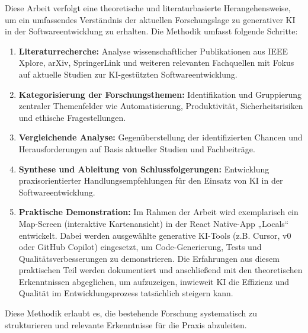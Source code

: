 Diese Arbeit verfolgt eine theoretische und literaturbasierte Herangehensweise, um ein umfassendes Verständnis der aktuellen Forschungslage zu generativer KI in der Softwareentwicklung zu erhalten. Die Methodik umfasst folgende Schritte:
\begin{enumerate}
    \item \textbf{Literaturrecherche:} Analyse wissenschaftlicher Publikationen aus IEEE Xplore, arXiv, SpringerLink und weiteren relevanten Fachquellen mit Fokus auf aktuelle Studien zur KI-gestützten Softwareentwicklung.
    \item \textbf{Kategorisierung der Forschungsthemen:} Identifikation und Gruppierung zentraler Themenfelder wie Automatisierung, Produktivität, Sicherheitsrisiken und ethische Fragestellungen.
    \item \textbf{Vergleichende Analyse:} Gegenüberstellung der identifizierten Chancen und Herausforderungen auf Basis aktueller Studien und Fachbeiträge.
    \item \textbf{Synthese und Ableitung von Schlussfolgerungen:} Entwicklung praxisorientierter Handlungsempfehlungen für den Einsatz von KI in der Softwareentwicklung.
    \item \textbf{Praktische Demonstration:} Im Rahmen der Arbeit wird exemplarisch ein Map-Screen (interaktive Kartenansicht) in der React Native-App „Locals“ entwickelt. Dabei werden ausgewählte generative KI-Tools (z.B. Cursor, v0 oder GitHub Copilot) eingesetzt, um Code-Generierung, Tests und Qualitätsverbesserungen zu demonstrieren. Die Erfahrungen aus diesem praktischen Teil werden dokumentiert und anschließend mit den theoretischen Erkenntnissen abgeglichen, um aufzuzeigen, inwieweit KI die Effizienz und Qualität im Entwicklungsprozess tatsächlich steigern kann.
\end{enumerate}

Diese Methodik erlaubt es, die bestehende Forschung systematisch zu strukturieren und relevante Erkenntnisse für die Praxis abzuleiten.